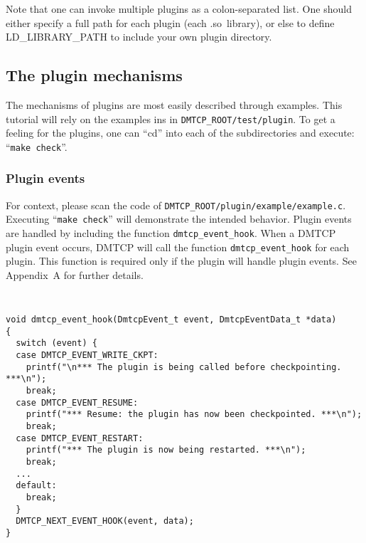 \documentclass{article}
\begin{document}
Note that one can invoke multiple plugins as a colon-separated list.
One should either specify a full path for each plugin (each .so~library),
or else to define LD\_LIBRARY\_PATH to include your own plugin directory.

\subsection{The plugin mechanisms}

The mechanisms of plugins are most easily described through examples.
This tutorial will rely on the examples ins in {\tt DMTCP\_ROOT/test/plugin}.
To get a feeling for the plugins, one can ``cd'' into each of the
subdirectories and execute: ``{\tt make check}''.

\subsubsection{Plugin events}

For context, please scan the code of {\tt DMTCP\_ROOT/plugin/example/example.c}.
Executing ``{\tt make check}'' will demonstrate the intended behavior.
Plugin events are handled by including the function {\tt dmtcp\_event\_hook}.
When a DMTCP plugin event occurs, DMTCP will call the
function {\tt dmtcp\_event\_hook} for each plugin.
This function is required only if the plugin will handle plugin events.
See Appendix~A for further details.

{\tt
\begin{verbatim}
void dmtcp_event_hook(DmtcpEvent_t event, DmtcpEventData_t *data)
{
  switch (event) {
  case DMTCP_EVENT_WRITE_CKPT:
    printf("\n*** The plugin is being called before checkpointing. ***\n");
    break;
  case DMTCP_EVENT_RESUME:
    printf("*** Resume: the plugin has now been checkpointed. ***\n");
    break;
  case DMTCP_EVENT_RESTART:
    printf("*** The plugin is now being restarted. ***\n");
    break;
  ...
  default:
    break;
  }
  DMTCP_NEXT_EVENT_HOOK(event, data);
}
\end{verbatim}
}


%
%
\end{document}
